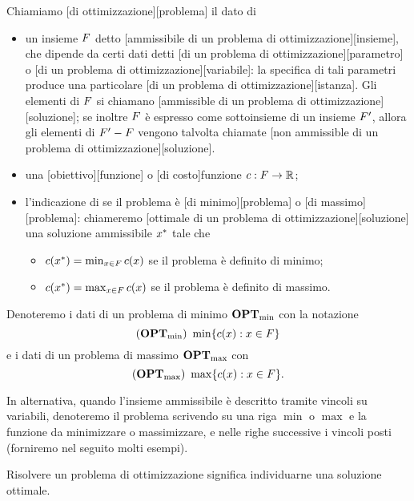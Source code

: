 \begin{Definition}
	Chiamiamo
	[di ottimizzazione][problema]
	il dato di
	\begin{itemize}
		\item un insieme $F$ detto
		[ammissibile di un problema di ottimizzazione][insieme],
		che dipende da certi dati detti
		[di un problema di ottimizzazione][parametro] o
		[di un problema di ottimizzazione][variabile]:
		la specifica di tali parametri produce una particolare
		[di un problema di ottimizzazione][istanza].
		Gli elementi di $F$ si chiamano
		[ammissible di un problema di ottimizzazione][soluzione];
		se inoltre $F$ \`e espresso come sottoinsieme
		di un insieme $F'$, allora gli elementi di
		$F' - F$ vengono talvolta chiamate
		[non ammissible di un problema di ottimizzazione][soluzione].
		\item una [obiettivo][funzione]
		o [di costo]{funzione}
		$c: F \rightarrow \mathbb{R}$;
		\item l'indicazione di se il problema \`e
		[di minimo][problema] o
		[di massimo][problema]: chiameremo
		[ottimale di un problema di ottimizzazione][soluzione]
		una soluzione ammissibile $x^*$ tale che
		\begin{itemize}
			\item $c(x^*) =
			\min_{x \in F}
			c(x)$ se il
			problema \`e definito di minimo;
			\item $c(x^*) =
			\max_{x \in F}
			c(x)$ se il
			problema \`e definito di massimo.
		\end{itemize}
	\end{itemize}
	Denoteremo i dati di un problema di minimo
	${\textbf{OPT}_{\min}}$ con la notazione
	$$({\textbf{OPT}_{\min}})\ \min \lbrace c(x): x \in F \rbrace$$
	e i dati di un problema di massimo ${\textbf{OPT}_{\max}}$ con
	$$({\textbf{OPT}_{\max}})\ \max \lbrace c(x): x \in F \rbrace.$$
	\par In alternativa, quando l'insieme ammissibile \`e descritto tramite vincoli su variabili, denoteremo il problema scrivendo su una riga $\min$ o $\max$ e la funzione da minimizzare o massimizzare, e nelle righe successive i vincoli posti (forniremo nel seguito molti esempi).
	\par Risolvere un problema di ottimizzazione significa individuarne una soluzione ottimale.
\end{Definition}
